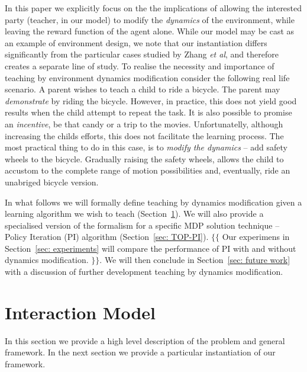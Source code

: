 \documentclass[letterpaper]{aamas2010}
\begin{document}
In this paper we explicitly focus on the the implications of allowing
the interested party (teacher, in our model) to modify the
\emph{dynamics} of the environment, while leaving the reward function
of the agent alone. While our model may be cast as an example of
environment design, we note that our instantiation differs
significantly from the particular cases studied by Zhang \emph{et al},
and therefore creates a separate line of study. To realise the
necessity and importance of teaching by environment dynamics
modification consider the following real life scenario. A parent
wishes to teach a child to ride a bicycle. The parent may {\em
  demonstrate} by riding the bicycle. However, in practice, this does
not yield good results when the child attempt to repeat the task. It
is also possible to promise an {\em incentive}, be that candy or a
trip to the movies. Unfortunatelly, although increasing the childs
efforts, this does not facilitate the learning process. The most
practical thing to do in this case, is to {\em modify the dynamics} -- add
safety wheels to the bicycle. Gradually raising the safety wheels,
allows the child to accustom to the complete range of motion
possibilities and, eventually, ride an unabriged bicycle version.

In what follows we will formally define teaching by dynamics
modification given a learning algorithm we wish to teach
(Section~\ref{sec: GeneralModel}). We will also provide a specialised
version of the formalism for a specific MDP solution technique --
Policy Iteration (PI) algorithm (Section~\ref{sec: TOP-PI}). $\{\{$
Our experimens in Section~\ref{sec: experiments} will compare the
performance of PI with and without dynamics modification. $\}\}$. We
will then conclude in Section~\ref{sec: future work} with a discussion of further
development teaching by dynamics modification.


\section{Interaction Model}\label{sec: GeneralModel}

In this section we provide a high level description of the problem and
general framework.  In the next section we provide a particular
instantiation of our framework.
\end{document}
